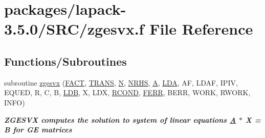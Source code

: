 \hypertarget{zgesvx_8f}{}\section{packages/lapack-\/3.5.0/\+S\+R\+C/zgesvx.f File Reference}
\label{zgesvx_8f}
\subsection*{Functions/\+Subroutines}
\begin{DoxyCompactItemize}
\item 
subroutine \hyperlink{group__complex16GEsolve_gabe3ae17895d46aeb7c9e5a076eaeeb69}{zgesvx} (\hyperlink{superlu__enum__consts_8h_af00a42ecad444bbda75cde1b64bd7e72a1b6692b56d378abb85bd49063721d034}{F\+A\+C\+T}, \hyperlink{superlu__enum__consts_8h_a0c4e17b2d5cea33f9991ccc6a6678d62a1f61e3015bfe0f0c2c3fda4c5a0cdf58}{T\+R\+A\+N\+S}, \hyperlink{polmisc_8c_a0240ac851181b84ac374872dc5434ee4}{N}, \hyperlink{example__user_8c_aa0138da002ce2a90360df2f521eb3198}{N\+R\+H\+S}, \hyperlink{classA}{A}, \hyperlink{example__user_8c_ae946da542ce0db94dced19b2ecefd1aa}{L\+D\+A}, A\+F, L\+D\+A\+F, I\+P\+I\+V, E\+Q\+U\+E\+D, R, C, B, \hyperlink{example__user_8c_a50e90a7104df172b5a89a06c47fcca04}{L\+D\+B}, X, L\+D\+X, \hyperlink{superlu__enum__consts_8h_af00a42ecad444bbda75cde1b64bd7e72a9b5c151728d8512307565994c89919d5}{R\+C\+O\+N\+D}, \hyperlink{superlu__enum__consts_8h_af00a42ecad444bbda75cde1b64bd7e72a78fd14d7abebae04095cfbe02928f153}{F\+E\+R\+R}, B\+E\+R\+R, W\+O\+R\+K, R\+W\+O\+R\+K, I\+N\+F\+O)
\begin{DoxyCompactList}\small\item\em {\bfseries  Z\+G\+E\+S\+V\+X computes the solution to system of linear equations \hyperlink{classA}{A} $\ast$ X = B for G\+E matrices} \end{DoxyCompactList}\end{DoxyCompactItemize}
